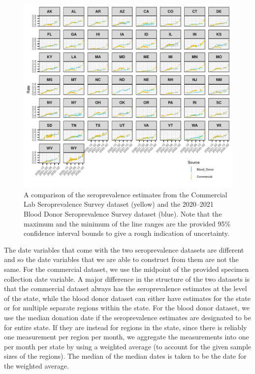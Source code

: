 \documentclass{article}
\begin{document}
\begin{figure}[!tb]
\centering
    \includegraphics[width=.99\textwidth]{sero_blood_comm_compar.pdf}
    \caption{A comparison of the seroprevalence estimates from the Commercial
    Lab Seroprevalence Survey dataset (yellow) and the 2020--2021 Blood Donor 
    Seroprevalence Survey dataset (blue). Note that the maximum and the minimum
    of the line ranges are the provided 95\% confidence interval bounds to 
    give a rough indication of uncertainty.}
    \label{fig:sero_blood_comm_compar}
\end{figure}

The date variables that come with the two seroprevalence datasets are different
and so the date variables that we are able to construct from them are
not the same. For the commercial dataset, we use the midpoint of the provided
specimen collection date variable. A major difference in the structure of the
two datasets is that the commercial dataset always has the seroprevalence
estimates at the level of the state, while the blood donor dataset can either have 
estimates for the state or for multiple separate regions within the state. For the 
blood donor dataset, we use the median donation date if the seroprevalence 
estimates are designated to be for entire state. If they are instead for regions in 
the state, since there is reliably one measurement per region per month, we 
aggregate the measurements into one per month per state by using a weighted 
average (to account for the given sample sizes of the regions). The median of the 
median dates is taken to be the date for the weighted average.
\end{document}

